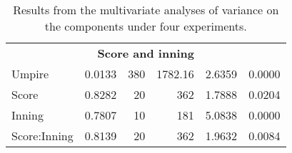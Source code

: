 \begin{table}[t!]
\begin{tabular}{lrrrrr}
\midrule
\multicolumn{6}{c}{\textbf{Score and inning}}\\\addlinespace
                  Umpire &        0.0133 &    380 &  1782.16 &   2.6359 &  0.0000 \\
                   Score &        0.8282 &     20 &      362 &   1.7888 &  0.0204 \\
                  Inning &        0.7807 &     10 &      181 &   5.0838 &  0.0000 \\
            Score:Inning &        0.8139 &     20 &      362 &   1.9632 &  0.0084 \\
\bottomrule
\end{tabular}
\vspace{2mm}
\caption{Results from the multivariate analyses of variance on the components under four experiments.}
\label{tab:inference.manova}
\end{table}
